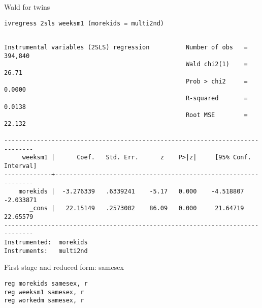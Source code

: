 \documentclass[cache=false]{article}
\begin{document}
Wald for twins
\begin{verbatim}
ivregress 2sls weeksm1 (morekids = multi2nd)
\end{verbatim}

\begin{verbatim}

Instrumental variables (2SLS) regression          Number of obs   =    394,840
                                                  Wald chi2(1)    =      26.71
                                                  Prob > chi2     =     0.0000
                                                  R-squared       =     0.0138
                                                  Root MSE        =     22.132

------------------------------------------------------------------------------
     weeksm1 |      Coef.   Std. Err.      z    P>|z|     [95% Conf. Interval]
-------------+----------------------------------------------------------------
    morekids |  -3.276339   .6339241    -5.17   0.000    -4.518807   -2.033871
       _cons |   22.15149   .2573002    86.09   0.000     21.64719    22.65579
------------------------------------------------------------------------------
Instrumented:  morekids
Instruments:   multi2nd
\end{verbatim}

First stage and reduced form: samesex
\begin{verbatim}
reg morekids samesex, r
reg weeksm1 samesex, r
reg workedm samesex, r
\end{verbatim}
\end{document}
